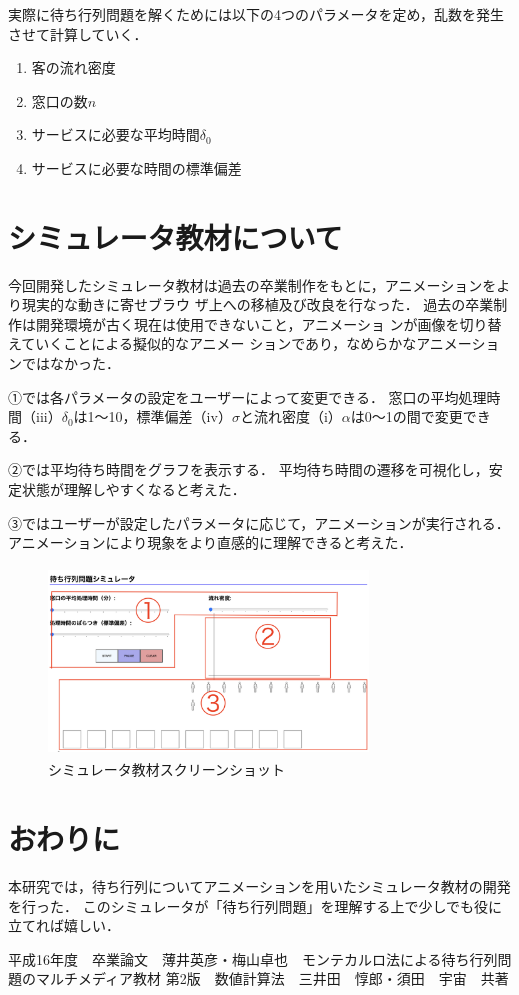 \documentclass[twocolumn,10pt,a4j]{ltjsarticle}
\begin{document}
実際に待ち行列問題を解くためには以下の4つのパラメータを定め，乱数を発生させて計算していく．
\begin{enumerate}
\renewcommand{\labelenumi}{(\roman{enumi})}
\item 客の流れ密度\alpha
\item 窓口の数$n$
\item サービスに必要な平均時間$\delta_0$
\item サービスに必要な時間の標準偏差\sigma
\end{enumerate}


\section{シミュレータ教材について}
今回開発したシミュレータ教材は過去の卒業制作をもとに，アニメーションをより現実的な動きに寄せブラウ ザ上への移植及び改良を行なった．
過去の卒業制作は開発環境が古く現在は使用できないこと，アニメーショ ンが画像を切り替えていくことによる擬似的なアニメー ションであり，なめらかなアニメーションではなかった．

①では各パラメータの設定をユーザーによって変更できる．
窓口の平均処理時間（iii）$\delta_0$は1〜10，標準偏差（iv）$\sigma$と流れ密度（i）$\alpha$は0〜1の間で変更できる．

②では平均待ち時間をグラフを表示する．
平均待ち時間の遷移を可視化し，安定状態が理解しやすくなると考えた．

③ではユーザーが設定したパラメータに応じて，アニメーションが実行される．
アニメーションにより現象をより直感的に理解できると考えた．

\begin{figure}[h]
\begin{center}
\includegraphics[clip,width=85mm,height=50mm]{figures/layout_ex.pdf}
\end{center}
\caption{シミュレータ教材スクリーンショット}
\label{fig:教科書}
\end{figure}

\section{おわりに}
本研究では，待ち行列についてアニメーションを用いたシミュレータ教材の開発を行った．
このシミュレータが「待ち行列問題」を理解する上で少しでも役に立てれば嬉しい．
\begin{thebibliography}{99}
平成16年度　卒業論文　薄井英彦・梅山卓也　モンテカルロ法による待ち行列問題のマルチメディア教材
 第2版　数値計算法　三井田　惇郎・須田　宇宙　共著
\end{thebibliography}
\end{document}
